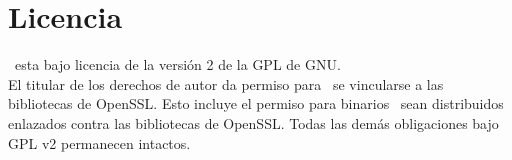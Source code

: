 \section{Licencia}

  \vsftpd\ esta bajo licencia de la versión 2 de la GPL de GNU.\\
  El titular de los derechos de autor da permiso para \vsftpd\ se vincularse a las bibliotecas de 
  OpenSSL. Esto incluye el permiso para binarios \vsftpd\ sean distribuidos enlazados contra las 
  bibliotecas de OpenSSL. Todas las dem\'as obligaciones bajo GPL v2 permanecen intactos.\\

